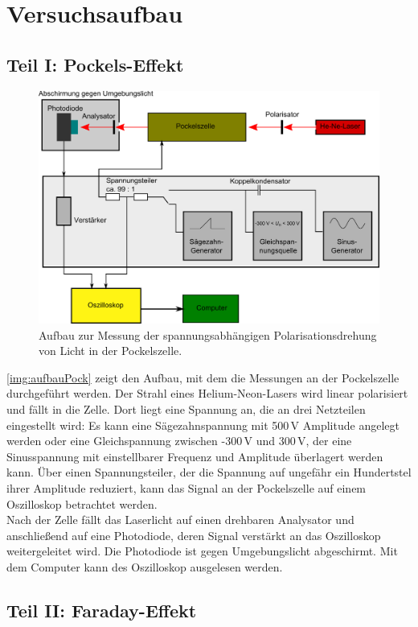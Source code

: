 \section{Versuchsaufbau}

\subsection{Teil I: Pockels-Effekt}
\begin{figure}[H]
\begin{center}
  \includegraphics[width=\textwidth]{../img/aufbauPock.pdf}
  \caption{Aufbau zur Messung der spannungsabhängigen Polarisationsdrehung von Licht in der Pockelszelle.}
  \label{img:aufbauPock}
\end{center}
\end{figure}
\autoref{img:aufbauPock} zeigt den Aufbau, mit dem die Messungen an der Pockelszelle durchgeführt werden.
Der Strahl eines Helium-Neon-Lasers wird linear polarisiert und fällt in die Zelle.
Dort liegt eine Spannung an, die an drei Netzteilen eingestellt wird:
Es kann eine Sägezahnspannung mit 500\,V Amplitude angelegt werden oder
eine Gleichspannung zwischen -300\,V und 300\,V,
der eine Sinusspannung mit einstellbarer Frequenz und Amplitude überlagert werden kann.
Über einen Spannungsteiler, der die Spannung auf ungefähr ein Hundertstel ihrer Amplitude reduziert,
kann das Signal an der Pockelszelle auf einem Oszilloskop betrachtet werden.\\
Nach der Zelle fällt das Laserlicht auf einen drehbaren Analysator und anschließend auf eine Photodiode,
deren Signal verstärkt an das Oszilloskop weitergeleitet wird.
Die Photodiode ist gegen Umgebungslicht abgeschirmt.
Mit dem Computer kann des Oszilloskop ausgelesen werden.


\subsection{Teil II: Faraday-Effekt}
\label{sub:setup:faraday}
